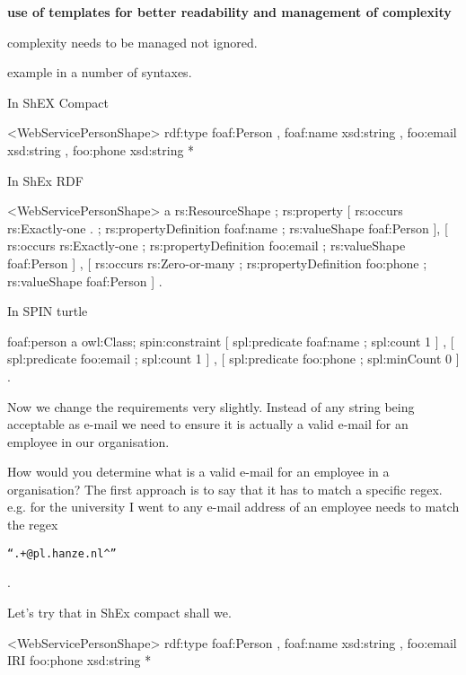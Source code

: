 \documentclass{llncs}
\begin{document}
\textbf{use of templates for better readability and management of complexity}
 
complexity needs to be managed not ignored.

example in a number of syntaxes.

In ShEX Compact

\begin{ex}
<WebServicePersonShape> {
  rdf:type foaf:Person ,
  foaf:name xsd:string ,
  foo:email xsd:string ,
  foo:phone xsd:string *
}
\end{ex}

In ShEx RDF

\begin{ex}
<WebServicePersonShape> a rs:ResourceShape ;
   rs:property  [ rs:occurs              rs:Exactly-one .  ;
                  rs:propertyDefinition  foaf:name ;
                  rs:valueShape          foaf:Person ],
                 [ rs:occurs              rs:Exactly-one ;
                  rs:propertyDefinition  foo:email ;
                  rs:valueShape          foaf:Person ] ,
                 [ rs:occurs              rs:Zero-or-many ;
                  rs:propertyDefinition  foo:phone ;
                  rs:valueShape          foaf:Person ] .
\end{ex}

In SPIN turtle

\begin{ex}
foaf:person a owl:Class;
spin:constraint [ spl:predicate foaf:name ;
                  spl:count 1 ] ,
                [ spl:predicate foo:email ;
                  spl:count 1 ] ,
                [ spl:predicate foo:phone ;
                  spl:minCount 0 ] .
\end{ex}

Now we change the requirements very slightly. Instead of any string being acceptable as e-mail we need to ensure
it is actually a valid e-mail for an employee in our organisation.

How would you determine what is a valid e-mail for an employee in a organisation?
The first approach is to say that it has to match a specific regex. e.g. for the university I went to any e-mail
address of an employee needs to match the regex \begin{verbatim}“.+@pl.hanze.nl^”\end{verbatim}.

Let's try that in ShEx compact shall we.

\begin{ex}
<WebServicePersonShape> {
  rdf:type foaf:Person ,
  foaf:name xsd:string ,
  foo:email IRI %
  foo:phone xsd:string *
}
\end{ex}
\end{document}
